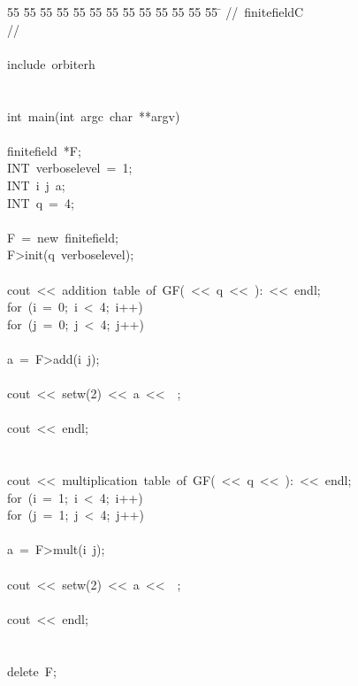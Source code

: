 %
%
\begin{tabbing}
55 \= 55 \= 55 \= 55 \= 55 \= 55 \= 55 \= 55 \= 55 \= 55 \= 55 \= 55 \= 55 \= \kill
//\ finitefieldC\\[0pt]
//\ \\[0pt]
\\[0pt]
include\ orbiterh\\[0pt]
\\[0pt]
\\[0pt]
int\ main(int\ argc\ char\ **argv)\\[0pt]
\\[0pt]
\>finitefield\ *F;\\[0pt]
\>INT\ verboselevel\ =\ 1;\\[0pt]
\>INT\ i\ j\ a;\\[0pt]
\>INT\ q\ =\ 4;\\[0pt]
\\[0pt]
\>F\ =\ new\ finitefield;\\[0pt]
\>F>init(q\ verboselevel);\\[0pt]
\\[0pt]
\>cout\ <<\ addition\ table\ of\ GF(\ <<\ q\ <<\ ):\ <<\ endl;\\[0pt]
\>for\ (i\ =\ 0;\ i\ <\ 4;\ i++)\ \\[0pt]
\>\>for\ (j\ =\ 0;\ j\ <\ 4;\ j++)\ \\[0pt]
\>\>\>\\[0pt]
\>\>\>a\ =\ F>add(i\ j);\\[0pt]
\\[0pt]
\>\>\>cout\ <<\ setw(2)\ <<\ a\ <<\ \ ;\\[0pt]
\>\>\>\\[0pt]
\>\>cout\ <<\ endl;\\[0pt]
\>\>\\[0pt]
\\[0pt]
\>cout\ <<\ multiplication\ table\ of\ GF(\ <<\ q\ <<\ ):\ <<\ endl;\\[0pt]
\>for\ (i\ =\ 1;\ i\ <\ 4;\ i++)\ \\[0pt]
\>\>for\ (j\ =\ 1;\ j\ <\ 4;\ j++)\ \\[0pt]
\>\>\>\\[0pt]
\>\>\>a\ =\ F>mult(i\ j);\\[0pt]
\\[0pt]
\>\>\>cout\ <<\ setw(2)\ <<\ a\ <<\ \ ;\\[0pt]
\>\>\>\\[0pt]
\>\>cout\ <<\ endl;\\[0pt]
\>\>\\[0pt]
\\[0pt]
\>delete\ F;\\[0pt]
\\[0pt]
\\[0pt]
\\[0pt]
\end{tabbing}
